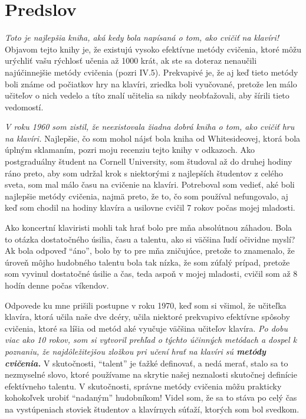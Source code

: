 \section*{Predslov}
\emph{Toto je najlepšia kniha, aká kedy bola napísaná o tom, ako cvičiť na klavíri!} Objavom tejto knihy je, že existujú vysoko efektívne metódy cvičenia, ktoré môžu urýchliť vašu rýchlosť učenia až 1000 krát, ak ste sa doteraz nenaučili najúčinnejšie metódy cvičenia (pozri IV.5). Prekvapivé je, že aj keď tieto metódy boli známe od počiatkov hry na klavíri, zriedka boli vyučované, pretože len málo učiteľov o nich vedelo a títo znalí učitelia sa nikdy neobťažovali, aby šírili tieto vedomostí.
\medskip

\emph{V roku 1960 som zistil, že neexistovala žiadna dobrá kniha o tom, ako cvičiť hru na klavíri.} Najlepšie, čo som mohol nájsť bola kniha od Whitesideovej, ktorá bola úplným sklamaním, pozri moju recenziu tejto knihy v odkazoch. Ako postgraduálny študent na Cornell University, som študoval až do druhej hodiny ráno preto, aby som  udržal krok s niektorými z najlepších študentov z celého sveta, som mal málo času na cvičenie na klavíri. Potreboval som vedieť, aké boli najlepšie metódy cvičenia, najmä preto, že to, čo som používal nefungovalo, aj keď som chodil na hodiny klavíra a usilovne cvičil 7 rokov počas mojej mladosti.

Ako koncertní klaviristi mohli tak hrať bolo pre mňa absolútnou záhadou. Bola to otázka dostatočného úsilia, času a talentu, ako si väčšina ľudí očividne myslí? Ak bola odpoveď “áno”, bolo by to pre mňa zničujúce, pretože to znamenalo, že úroveň môjho hudobného talentu bola tak nízka, že som zúfalý prípad, pretože som vyvinul dostatočné úsilie a čas, teda aspoň v mojej mladosti, cvičil som až 8 hodín denne počas víkendov.

Odpovede ku mne prišili postupne v roku 1970, keď som si všimol, že učiteľka klavíra, ktorá učila  naše dve dcéry, učila niektoré prekvapivo efektívne spôsoby cvičenia, ktoré sa líšia od metód aké vyučuje väčšina učiteľov klavíra. \emph{Po dobu viac ako 10 rokov, som si vytvoril prehľad o týchto účinných metódach a dospel k poznaniu, že najdôležitejšou zložkou pri učení hrať na klavíri sú \textbf{metódy cvičenia.}} V skutočnosti, “talent” je ťažké definovať, a nedá merať, stalo sa to nezmyselné slovo, ktoré používame na skrytie našej neznalosti skutočnej definície efektívneho talentu. V skutočnosti, správne metódy cvičenia môžu prakticky kohokoľvek urobiť “nadaným” hudobníkom! Videl som, že sa to stáva po celý čas na vystúpeniach stoviek študentov a klavírnych súťaží, ktorých som bol svedkom.

